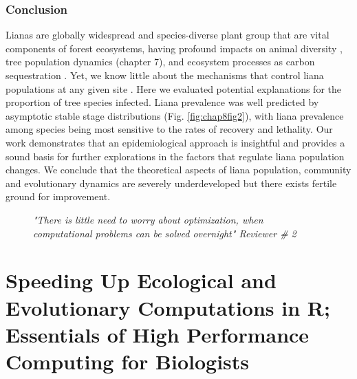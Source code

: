 \documentclass[b5paper,justified]{tufte-book} %
\begin{document}
\begin{fullwidth}
\subsection{Conclusion}
Lianas are globally widespread and species-diverse plant group that are vital components of forest ecosystems, having profound impacts on animal diversity \citep{Yanoviak2015}, tree population dynamics (chapter 7), and ecosystem processes as carbon sequestration \citep{Schnitzer2014, Heijden2015}. Yet, we know little about the mechanisms that control liana populations at any given site \citep{Muller-Landau2016}. Here we evaluated potential explanations for the proportion of tree species infected. Liana prevalence was well predicted by asymptotic stable stage distributions (Fig. \ref{fig:chap8fig2}), with liana prevalence among species being most sensitive to the rates of recovery and lethality. Our work demonstrates that an epidemiological approach is insightful and provides a sound basis for further explorations in the factors that regulate liana population changes. We conclude that the theoretical aspects of liana population, community and evolutionary dynamics are severely underdeveloped but there exists fertile ground for improvement. 

\end{fullwidth}

\begin{landscape}
\begin{figure}
\vspace*{-.6cm}\hspace*{4.4cm}
\hspace*{5cm}\begin{minipage}{18cm} 
\textit{ \footnotesize "There is little need to worry about optimization, when computational problems can be solved overnight" Reviewer \# 2}
\end{minipage}
\end{figure}
\end{landscape}
	

\chapter{Speeding Up Ecological and Evolutionary Computations in R; Essentials of High Performance Computing for Biologists}
\label{ch9} 
\end{document}
